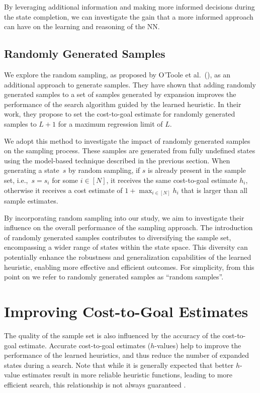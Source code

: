 By leveraging additional information and making more informed decisions during the state completion, we can investigate the gain that a more informed approach can have on the learning and reasoning of the NN.

\subsection{Randomly Generated Samples}
\label{sec:random-samples-theory}

We explore the random sampling, as proposed by O'Toole et al.~(\citeyear{OToole/2022}), as an additional approach to generate samples. They have shown that adding randomly generated samples to a set of samples generated by expansion improves the performance of the search algorithm guided by the learned heuristic. In their work, they propose to set the cost-to-goal estimate for randomly generated samples to $L+1$ for a maximum regression limit of $L$.

We adopt this method to investigate the impact of randomly generated samples on the sampling process. These samples are generated from fully undefined states using the model-based technique described in the previous section. When generating a state~$s$ by random sampling, if $s$ is already present in the sample set, i.e.,~$s = s_i$ for some $i\in[N]$, it receives the same cost-to-goal estimate $h_i$, otherwise it receives a cost estimate of $1+\max_{i\in[N]} h_i$ that is larger than all sample estimates.

By incorporating random sampling into our study, we aim to investigate their influence on the overall performance of the sampling approach. The introduction of randomly generated samples contributes to diversifying the sample set, encompassing a wider range of states within the state space. This diversity can potentially enhance the robustness and generalization capabilities of the learned heuristic, enabling more effective and efficient outcomes. For simplicity, from this point on we refer to randomly generated samples as ``random samples''.

\section{Improving Cost-to-Goal Estimates}
\label{sec:hvalue}

The quality of the sample set is also influenced by the accuracy of the cost-to-goal estimate. Accurate cost-to-goal estimates ($h$-values) help to improve the performance of the learned heuristics, and thus reduce the number of expanded states during a search. Note that while it is generally expected that better $h$-value estimates result in more reliable heuristic functions, leading to more efficient search, this relationship is not always guaranteed \cite{Holte/2010}.

